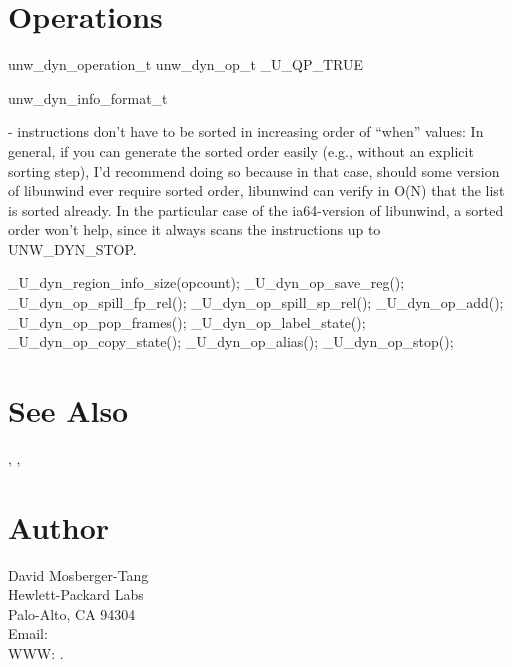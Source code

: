 \documentclass{article}
\begin{document}
\section{Operations}

unw\_dyn\_operation\_t
unw\_dyn\_op\_t
 \_U\_QP\_TRUE

unw\_dyn\_info\_format\_t

- instructions don't have to be sorted in increasing order of ``when''
  values: In general, if you can generate the sorted order easily
  (e.g., without an explicit sorting step), I'd recommend doing so
  because in that case, should some version of libunwind ever require
  sorted order, libunwind can verify in O(N) that the list is sorted
  already.  In the particular case of the ia64-version of libunwind, a
  sorted order won't help, since it always scans the instructions up
  to UNW_DYN_STOP.

\_U\_dyn\_region\_info\_size(opcount);
\_U\_dyn\_op\_save\_reg();
\_U\_dyn\_op\_spill\_fp\_rel();
\_U\_dyn\_op\_spill\_sp\_rel();
\_U\_dyn\_op\_add();
\_U\_dyn\_op\_pop\_frames();
\_U\_dyn\_op\_label\_state();
\_U\_dyn\_op\_copy\_state();
\_U\_dyn\_op\_alias();
\_U\_dyn\_op\_stop();

\section{See Also}

,
,

\section{Author}

\noindent
David Mosberger-Tang\\
Hewlett-Packard Labs\\
Palo-Alto, CA 94304\\
Email: \\
WWW: .
\LatexManEnd
\end{document}
